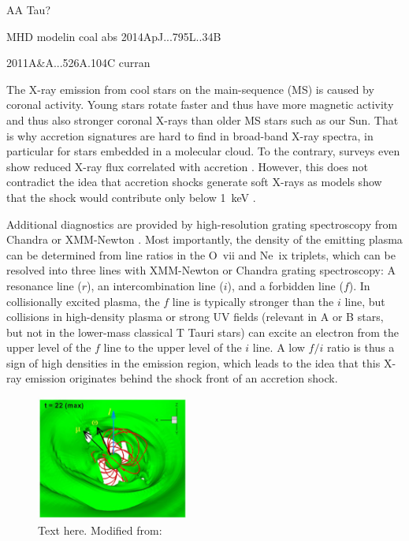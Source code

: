 AA Tau?

MHD modelin coal abs 2014ApJ...795L..34B 

2011A&A...526A.104C curran



The X-ray emission from cool stars on the main-sequence (MS) is caused by coronal activity. Young stars rotate faster and thus have more magnetic activity and thus also stronger coronal X-rays than older MS stars such as our Sun. That is why accretion signatures are hard to find in broad-band X-ray spectra, in particular for stars embedded in a molecular cloud. To the contrary, surveys even show reduced X-ray flux correlated with accretion \cite{2005ApJS..160..401P}. However, this does not contradict the idea that accretion shocks generate soft X-rays as models show that the shock would contribute only below 1~keV \cite{1999AstL...25..430L}.

Additional diagnostics are provided by high-resolution grating spectroscopy from Chandra or XMM-Newton \cite{Kastner_2002}. Most importantly, the density of the emitting plasma can be determined from line ratios in the O~{\sc vii} and Ne~{\sc ix} triplets, which can be resolved into three lines with XMM-Newton or Chandra grating spectroscopy: A resonance line ($r$), an intercombination line ($i$), and a forbidden line ($f$). In collisionally excited plasma, the $f$ line is typically stronger than the $i$ line, but collisions in high-density plasma or strong UV fields (relevant in A or B stars, but not in the lower-mass classical T Tauri stars) can excite an electron from the upper level of the $f$ line to the upper level of the $i$ line. A low $f/i$ ratio is thus a sign of high densities in the emission region, which leads to the idea that this X-ray emission originates behind the shock front of an accretion shock.

\begin{figure}[t]
\centering
\includegraphics[width=5cm]{figs/Romanova2021fig8-panel.png}
\caption{Text here. Modified from:  \cite{2013ApJ...771...70G} \label{fig:softexcess}}
\end{figure}

